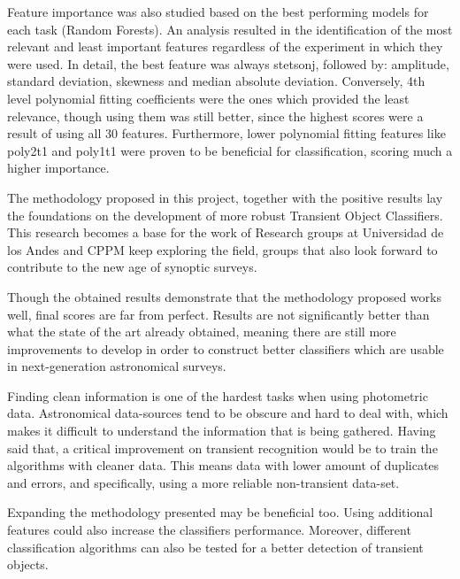 \documentclass[a4paper,fleqn,usenatbib]{mnras}
\begin{document}
Feature importance was also studied based on the best performing models for each task (Random Forests). An analysis resulted in the identification of the most relevant and least important features regardless of the experiment in which they were used. In detail, the best feature was always stetson\textunderscore j, followed by: amplitude, standard deviation, skewness and median absolute deviation. Conversely, 4th level polynomial fitting coefficients were the ones which provided the least relevance, though using them was still better, since the highest scores were a result of using all 30 features. Furthermore, lower polynomial fitting features like poly2\textunderscore t1 and poly1\textunderscore t1 were proven to be beneficial for classification, scoring much a higher importance.

The methodology proposed in this project, together with the positive results lay the foundations on the development of more robust Transient Object Classifiers. This research becomes a base for the work of Research groups at Universidad de los Andes and CPPM keep exploring the field, groups that also look forward to contribute to the new age of synoptic surveys.


Though the obtained results demonstrate that the methodology proposed works well, final scores are far from perfect. Results are not significantly better than what the state of the art already obtained, meaning there are still more improvements to develop in order to construct better classifiers which are usable in next-generation astronomical surveys. 

Finding clean information is one of the hardest tasks when using photometric data. Astronomical data-sources tend to be obscure and hard to deal with, which makes it difficult to understand the information that is being gathered. Having said that, a critical improvement on transient recognition would be to train the algorithms with cleaner data. This means data with lower amount of duplicates and errors, and specifically, using a more reliable non-transient data-set. 

Expanding the methodology presented may be beneficial too. Using additional features could also increase the classifiers performance. Moreover, different classification algorithms can also be tested for a better detection of transient objects.
\end{document}
